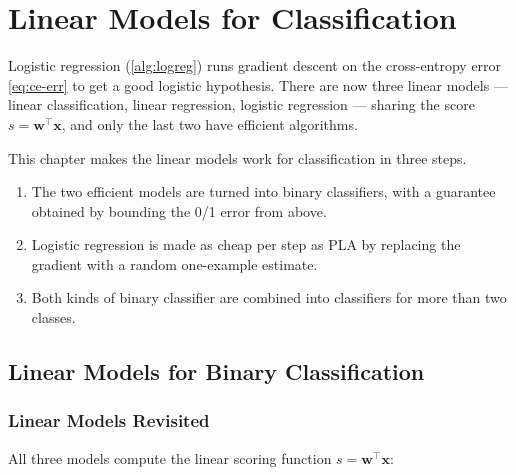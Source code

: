 \chapter{Linear Models for Classification}

\begin{prev}
    Logistic regression (\autoref{alg:logreg}) runs gradient descent on the
    cross-entropy error \eqref{eq:ce-err} to get a good logistic hypothesis.
    There are now three linear models --- linear classification, linear
    regression, logistic regression --- sharing the score \(s = \bm{w}^\top
    \bm{x}\), and only the last two have efficient algorithms.
\end{prev}

This chapter makes the linear models work for classification in three steps.
\begin{enumerate}
    \item The two efficient models are turned into binary classifiers, with a
        guarantee obtained by bounding the 0/1 error from above.
    \item Logistic regression is made as cheap per step as PLA by replacing the
        gradient with a random one-example estimate.
    \item Both kinds of binary classifier are combined into classifiers for
        more than two classes.
\end{enumerate}

\section{Linear Models for Binary Classification}\label{sec:linmodels-binary}


\subsection{Linear Models Revisited}

All three models compute the linear scoring function \(s = \bm{w}^\top \bm{x}\):

